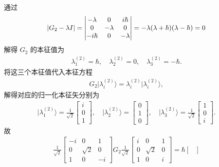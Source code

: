 \documentclass{assignment}
\begin{document}
\begin{pf}
    通过
    \begin{align}
        \left\lvert G_2-\lambda I\right\rvert=\begin{vmatrix}
            -\lambda&0&i\hbar\\
            0&-\lambda&0\\
            -i\hbar&0&-\lambda
        \end{vmatrix}=-\lambda(\lambda+\hbar)(\lambda-\hbar)=0
    \end{align}
    解得 $G_2$ 的本征值为
    \begin{align}
        \lambda_1^{(2)}=\hbar,\quad\lambda_2^{(2)}=0,\quad\lambda_3^{(2)}=-\hbar.
    \end{align}
    将这三个本征值代入本征方程
    \begin{align}
        G_2\lvert\lambda_i^{(2)}\rangle=\lambda_i^{(2)}\lvert\lambda_i^{(2)}\rangle,
    \end{align}
    解得对应的归一化本征矢分别为
    \begin{align}
        \lvert\lambda_1^{(2)}\rangle=\frac{1}{\sqrt{2}}\begin{bmatrix}
            i\\
            0\\
            1
        \end{bmatrix},\quad\lvert\lambda_2^{(2)}\rangle=\begin{bmatrix}
            0\\
            1\\
            0
        \end{bmatrix},\quad\lvert\lambda_3^{(2)}\rangle=\frac{1}{\sqrt{2}}\begin{bmatrix}
            1\\
            0\\
            i
        \end{bmatrix}.
    \end{align}
    故
    \begin{align}
        \frac{1}{\sqrt{2}}\begin{bmatrix}
            -i&0&1\\
            0&\sqrt{2}&0\\
            1&0&-i
        \end{bmatrix}G_2\frac{1}{\sqrt{2}}\begin{bmatrix}
            i&0&1\\
            0&\sqrt{2}&0\\
            1&0&i
        \end{bmatrix}=\hbar\begin{bmatrix}

\end{bmatrix}
\end{align}
\end{pf}
\end{document}
